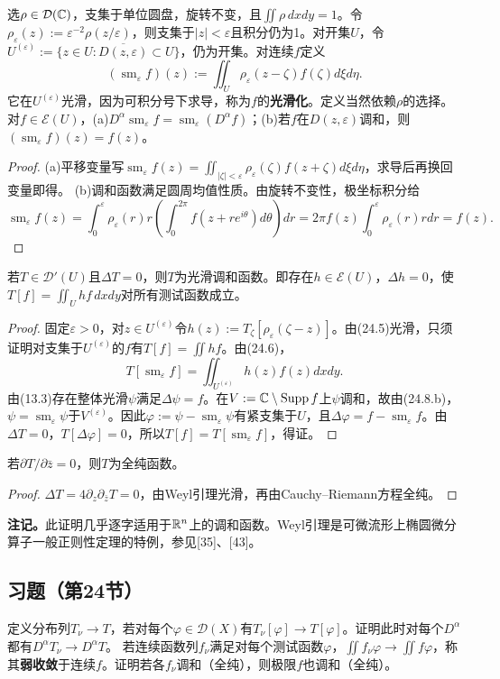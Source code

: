 选$\rho\in\mathcal D(\mathbb C)$，支集于单位圆盘，旋转不变，且$\iint\rho\,dxdy=1$。令$\rho_\varepsilon(z):=\varepsilon^{-2}\rho(z/\varepsilon)$，则支集于$|z|<\varepsilon$且积分仍为1。对开集$U$，令$U^{(\varepsilon)}:=\{z\in U:\overline{D(z,\varepsilon)}\subset U\}$，仍为开集。对连续$f$定义
\[
(\operatorname{sm}_\varepsilon f)(z):=\iint_U\rho_\varepsilon(z-\zeta)f(\zeta)d\xi d\eta.
\]
它在$U^{(\varepsilon)}$光滑，因为可积分号下求导，称为$f$的\textbf{光滑化}。定义当然依赖$\rho$的选择。
对$f\in\mathcal E(U)$，(a)$D^\alpha\operatorname{sm}_\varepsilon f=\operatorname{sm}_\varepsilon(D^\alpha f)$；(b)若$f$在$D(z,\varepsilon)$调和，则$(\operatorname{sm}_\varepsilon f)(z)=f(z)$。
\begin{proof}
(a)平移变量写$\operatorname{sm}_\varepsilon f(z)=\iint_{|\zeta|<\varepsilon}\rho_\varepsilon(\zeta)f(z+\zeta)d\xi d\eta$，求导后再换回变量即得。
(b)调和函数满足圆周均值性质。由旋转不变性，极坐标积分给
\[
\operatorname{sm}_\varepsilon f(z)=\int_0^\varepsilon\rho_\varepsilon(r)r\left(\int_0^{2\pi}f(z+re^{i\theta})d\theta\right)dr
=2\pi f(z)\int_0^\varepsilon\rho_\varepsilon(r)rdr=f(z).
\]
\end{proof}
若$T\in\mathcal D'(U)$且$\Delta T=0$，则$T$为光滑调和函数。即存在$h\in\mathcal E(U)$，$\Delta h=0$，使$T[f]=\iint_Uh f\,dxdy$对所有测试函数成立。
\begin{proof}
固定$\varepsilon>0$，对$z\in U^{(\varepsilon)}$令$h(z):=T_\zeta[\rho_\varepsilon(\zeta-z)]$。由(24.5)光滑，只须证明对支集于$U^{(\varepsilon)}$的$f$有$T[f]=\iint h f$。由(24.6)，
\[
T[\operatorname{sm}_\varepsilon f]=\iint_{U^{(\varepsilon)}}h(z)f(z)dxdy.
\]
由(13.3)存在整体光滑$\psi$满足$\Delta\psi=f$。在$V:=\mathbb C\setminus\operatorname{Supp}f$上$\psi$调和，故由(24.8.b)，$\psi=\operatorname{sm}_\varepsilon\psi$于$V^{(\varepsilon)}$。因此$\varphi:=\psi-\operatorname{sm}_\varepsilon\psi$有紧支集于$U$，且$\Delta\varphi=f-\operatorname{sm}_\varepsilon f$。由$\Delta T=0$，$T[\Delta\varphi]=0$，所以$T[f]=T[\operatorname{sm}_\varepsilon f]$，得证。
\end{proof}
若$\partial T/\partial\bar z=0$，则$T$为全纯函数。
\begin{proof}$\Delta T=4\partial_z\partial_{\bar z}T=0$，由Weyl引理光滑，再由Cauchy--Riemann方程全纯。\end{proof}
\textbf{注记。}此证明几乎逐字适用于$\mathbb R^n$上的调和函数。Weyl引理是可微流形上椭圆微分算子一般正则性定理的特例，参见[35]、[43]。
\subsection*{习题（第24节）}
定义分布列$T_\nu\to T$，若对每个$\varphi\in\mathcal D(X)$有$T_\nu[\varphi]\to T[\varphi]$。证明此时对每个$D^\alpha$都有$D^\alpha T_\nu\to D^\alpha T$。
若连续函数列$f_\nu$满足对每个测试函数$\varphi$，$\iint f_\nu\varphi\to\iint f\varphi$，称其\textbf{弱收敛}于连续$f$。证明若各$f_\nu$调和（全纯），则极限$f$也调和（全纯）。
